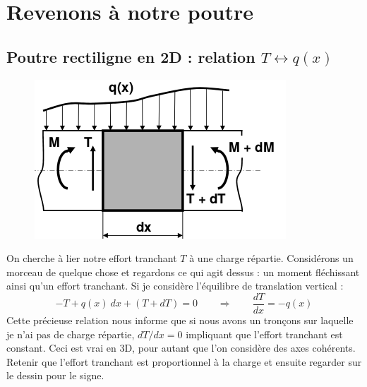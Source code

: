 	
\section{Revenons à notre poutre}
	\subsection{Poutre rectiligne en 2D : relation $T \leftrightarrow 
	q(x)$}
	\begin{figure}
	\vspace{-5mm}
	\includegraphics[scale=0.45]{ch2/image11.png}
	\end{figure}
	On cherche à lier notre effort tranchant $T$ à une charge 
	répartie. Considérons un morceau de quelque chose et regardons ce 
	qui agit dessus : un moment fléchissant ainsi qu'un effort 
	tranchant. Si je considère l'équilibre de translation vertical :
	\newpage
	\begin{equation}
	-T + q(x)\ dx + (T+dT) = 0\qquad\Longrightarrow\qquad \dfrac{dT}{dx}
	=-q(x)
	\end{equation}
	Cette précieuse relation nous informe que si nous avons un tronçons 
	sur laquelle je n'ai pas de charge répartie, $dT/dx = 0$ impliquant 
	que l'effort tranchant est constant. Ceci est vrai en 3D, pour autant 
	que l'on considère des axes cohérents.\\
	\danger Retenir que l'effort tranchant est proportionnel à la charge 
	et ensuite regarder sur le dessin pour le signe.
